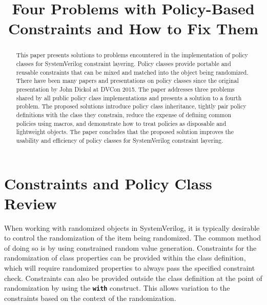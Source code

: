 \documentclass[conference,onecolumn]{IEEEtran}
\newcommand{\code}[1]{
\textbf{\texttt{#1}}
}
\begin{document}
\title{Four Problems with Policy-Based Constraints and How to Fix Them}

\author{
    \and
}

\maketitle

\thispagestyle{plain}
\pagestyle{plain}

\begin{abstract}
    This paper presents solutions to problems encountered in the implementation of policy classes for SystemVerilog constraint layering. Policy classes provide portable and reusable constraints that can be mixed and matched into the object being randomized. There have been many papers and presentations on policy classes since the original presentation by John Dickol at DVCon 2015. The paper addresses three problems shared by all public policy class implementations and presents a solution to a fourth problem. The proposed solutions introduce policy class inheritance, tightly pair policy definitions with the class they constrain, reduce the expense of defining common policies using macros, and demonstrate how to treat policies as disposable and lightweight objects. The paper concludes that the proposed solution improves the usability and efficiency of policy classes for SystemVerilog constraint layering.
\end{abstract}

\section{Constraints and Policy Class Review}

When working with randomized objects in SystemVerilog, it is typically desirable to control the randomization of the item being randomized. The common method of doing so is by using constrained random value generation. Constraints for the randomization of class properties can be provided within the class definition, which will require randomized properties to always pass the specified constraint check. Constraints can also be provided outside the class definition at the point of randomization by using the \code{with} construct. This allows variation to the constraints based on the context of the randomization. 
\end{document}
